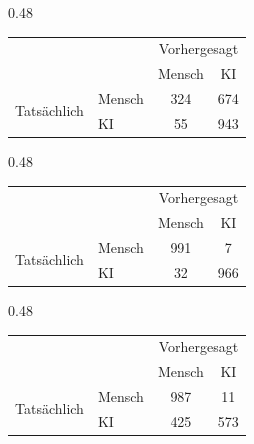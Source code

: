 \begin{table}[htbp]
  \begin{subtable}[t]{0.48\textwidth}
    \centering
    \begin{tabular}{ll cc}
      \toprule
                                   &        & \multicolumn{2}{c}{Vorhergesagt}       \\
                                   &        & Mensch                           & KI  \\
      \midrule
      \multirow{2}{*}{Tatsächlich} & Mensch & 324                              & 674 \\
                                   & KI     & 55                               & 943 \\
      \bottomrule
    \end{tabular}
    \label{tab:cm-radar}
  \end{subtable}
  \hfill
  \begin{subtable}[t]{0.48\textwidth}
    \centering
    \begin{tabular}{ll cc}
      \toprule
                                   &        & \multicolumn{2}{c}{Vorhergesagt}       \\
                                   &        & Mensch                           & KI  \\
      \midrule
      \multirow{2}{*}{Tatsächlich} & Mensch & 991                              & 7   \\
                                   & KI     & 32                               & 966 \\
      \bottomrule
    \end{tabular}
    \label{tab:cm-binoculars}
  \end{subtable}

  \vspace{0.5cm} %

  \begin{subtable}[t]{0.48\textwidth}
    \centering
    \begin{tabular}{ll cc}
      \toprule
                                   &        & \multicolumn{2}{c}{Vorhergesagt}       \\
                                   &        & Mensch                           & KI  \\
      \midrule
      \multirow{2}{*}{Tatsächlich} & Mensch & 987                              & 11  \\
                                   & KI     & 425                              & 573 \\
      \bottomrule
    \end{tabular}
    \label{tab:cm-majority}
  \end{subtable}
  \hfill

\end{table}

